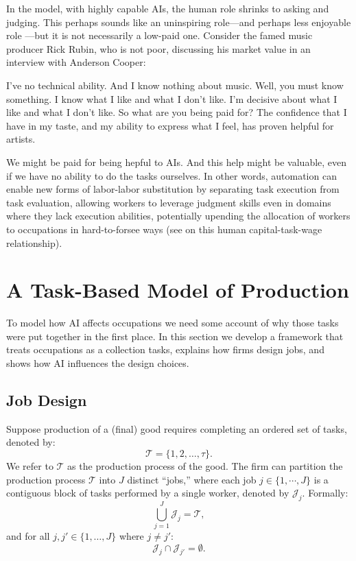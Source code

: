 \documentclass{article}
\theoremstyle{plain}
\theoremstyle{plain}
\begin{document}
In the model, with highly capable AIs, the human role shrinks to asking and judging. 
This perhaps sounds like an uninspiring role---and perhaps less enjoyable role \citep{toner2024artificial}---but it is not necessarily a low-paid one. 
Consider the famed music producer Rick Rubin, who is not poor, discussing his market value in an interview with Anderson Cooper:
\begin{dialogue}
     I've no technical ability. And I know nothing about music.
     Well, you must know something.
     I know what I like and what I don't like. I'm decisive about what I like and what I don't like.
     So what are you being paid for?
     The confidence that I have in my taste, and my ability to express what I feel, has proven helpful for artists.
\end{dialogue}
We might be paid for being hepful to AIs.
And this help might be valuable, even if we have no ability to do the tasks ourselves.
In other words, automation can enable new forms of labor-labor substitution by separating task execution from task evaluation, allowing workers to leverage judgment skills even in domains where they lack execution abilities, potentially upending the allocation of workers to occupations in hard-to-forsee ways (see \cite{autor2013putting} on this human capital-task-wage relationship).



\section{A Task-Based Model of Production}
\label{sec:taskbased_prod}

To model how AI affects occupations we need some account of why those tasks were put together in the first place.
In this section we develop a framework that treats occupations as a collection tasks, explains how firms design jobs, and shows how AI influences the design choices.


\subsection{Job Design}
\label{sec:job_design}

Suppose production of a (final) good requires completing an ordered set of tasks, denoted by:
\begin{equation}
\label{eq:tasks}
\mathcal{T} = \{1,2,\ldots,\tau\}.
\end{equation}
We refer to $\mathcal{T}$ as the production process of the good.
The firm can partition the production process $\mathcal{T}$ into $J$ distinct ``jobs,'' where each job $j \in \{1, \cdots, J \}$ is a contiguous block of tasks performed by a single worker, denoted by $\mathcal{J}_j$.
Formally:
\[
\bigcup_{j=1}^J \mathcal{J}_j = \mathcal{T}, 
\]
and for all $j,j' \in \{1,\dots,J\}$ where $j \neq j'$:
\[
\mathcal{J}_j \cap \mathcal{J}_{j'} = \emptyset.
\]
\end{document}
